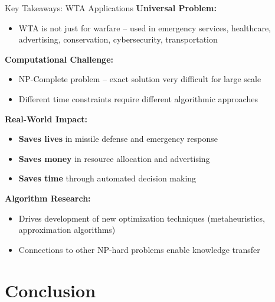 \documentclass[aspectratio=43,8pt]{beamer}
\begin{document}
\begin{frame}{Key Takeaways: WTA Applications}
\textbf{Universal Problem:}
\begin{itemize}
    \item WTA is not just for warfare -- used in emergency services, healthcare, advertising, conservation, cybersecurity, transportation
\end{itemize}

\textbf{Computational Challenge:}
\begin{itemize}
    \item NP-Complete problem -- exact solution very difficult for large scale
    \item Different time constraints require different algorithmic approaches
\end{itemize}

\textbf{Real-World Impact:}
\begin{itemize}
    \item \textbf{Saves lives} in missile defense and emergency response
    \item \textbf{Saves money} in resource allocation and advertising
    \item \textbf{Saves time} through automated decision making
\end{itemize}

\textbf{Algorithm Research:}
\begin{itemize}
    \item Drives development of new optimization techniques (metaheuristics, approximation algorithms)
    \item Connections to other NP-hard problems enable knowledge transfer
\end{itemize}
\end{frame}

\section{Conclusion}
\end{document}
